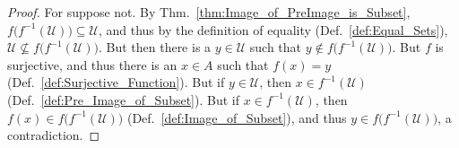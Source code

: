         \begin{proof}
            For suppose not. By Thm.~\ref{thm:Image_of_PreImage_is_Subset},
            $f\big(f^{\minus{1}}(\mathcal{U})\big)\subseteq\mathcal{U}$, and
            thus by the definition of equality (Def.~\ref{def:Equal_Sets}),
            $\mathcal{U}\nsubseteq{f}\big(f^{\minus{1}}(\mathcal{U})\big)$.
            But then there is a $y\in\mathcal{U}$ such that
            $y\notin{f}\big(f^{\minus{1}}(\mathcal{U})\big)$. But $f$ is
            surjective, and thus there is an $x\in{A}$ such that $f(x)=y$
            (Def.~\ref{def:Surjective_Function}). But if $y\in\mathcal{U}$,
            then $x\in{f}^{\minus{1}}(\mathcal{U})$
            (Def.~\ref{def:Pre_Image_of_Subset}). But if
            $x\in{f}^{\minus{1}}(\mathcal{U})$, then
            $f(x)\in{f}\big(f^{\minus{1}}(\mathcal{U})\big)$
            (Def.~\ref{def:Image_of_Subset}), and thus
            $y\in{f}\big(f^{\minus{1}}(\mathcal{U})\big)$, a contradiction.
        \end{proof}
